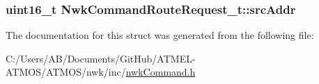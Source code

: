 \hypertarget{struct_nwk_command_route_request__t_a47a581bfa6b97c773d12eeba64418657}{
\subsubsection[{src\-Addr}]{\setlength{\rightskip}{0pt plus 5cm}uint16\-\_\-t Nwk\-Command\-Route\-Request\-\_\-t\-::src\-Addr}}\label{struct_nwk_command_route_request__t_a47a581bfa6b97c773d12eeba64418657}


The documentation for this struct was generated from the following file\-:\begin{DoxyCompactItemize}
\item 
C\-:/\-Users/\-A\-B/\-Documents/\-Git\-Hub/\-A\-T\-M\-E\-L-\/\-A\-T\-M\-O\-S/\-A\-T\-M\-O\-S/nwk/inc/\hyperlink{nwk_command_8h}{nwk\-Command.\-h}\end{DoxyCompactItemize}
